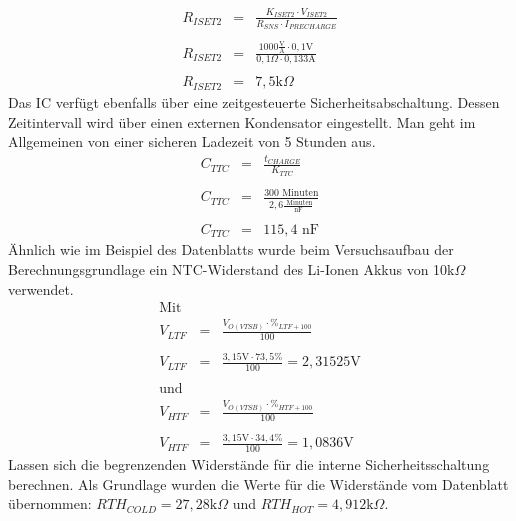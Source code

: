 \documentclass[12pt]{scrreprt} %
\begin{document}
\begin{eqnarray}
R_{ISET2}&=&\frac{K_{ISET2} \cdot V_{ISET2}}{R_{SNS} \cdot I_{PRECHARGE}}\\
 \nonumber \\
R_{ISET2}&=&\frac{1000 \frac{\text{V}}{\text{A}} \cdot 0,1\text{V}}{0,1\Omega \cdot 0,133\text{A}}\\
 \nonumber \\
R_{ISET2}&=&7,5\text{k}\Omega
\end{eqnarray}
Das IC verfügt ebenfalls über eine zeitgesteuerte Sicherheitsabschaltung. Dessen Zeitintervall wird über einen externen Kondensator eingestellt. Man geht im Allgemeinen von einer sicheren Ladezeit von 5 Stunden aus. 
\begin{eqnarray}
C_{TTC}&=&\frac{t_{CHARGE}}{K_{TTC}}\\
\nonumber\\
C_{TTC}&=&\frac{300 \text{ Minuten} }{2,6 \frac{\text{ Minuten}}{\text{nF}}}\\
\nonumber\\
C_{TTC}&=& 115,4\text{ nF}
\end{eqnarray}
Ähnlich wie im Beispiel des Datenblatts wurde beim Versuchsaufbau der Berechnungsgrundlage ein NTC-Widerstand des Li-Ionen Akkus von 10k$\Omega$  verwendet.\\
\begin{eqnarray}
\text{Mit }&& \nonumber\\
V_{LTF}&=&\frac{V_{O(VTSB)} \cdot \%_{LTF+100}}{100}\\
\nonumber\\
V_{LTF}&=&\frac{3,15\text{V} \cdot 73,5\%}{100} = 2,31525\text{V}\\
\nonumber\\
\text{und } && \nonumber\\
V_{HTF}&=&\frac{V_{O(VTSB)} \cdot \%_{HTF+100}}{100}\\
\nonumber\\
V_{HTF}&=&\frac{3,15\text{V} \cdot 34,4\%}{100} = 1,0836\text{V}
\end{eqnarray}
Lassen sich die begrenzenden Widerstände für die interne Sicherheitsschaltung berechnen. Als Grundlage wurden die Werte für die Widerstände vom Datenblatt übernommen: $RTH_{COLD} = 27,28\text{k}\Omega$ und $RTH_{HOT} = 4,912\text{k}\Omega$.
\end{document}

